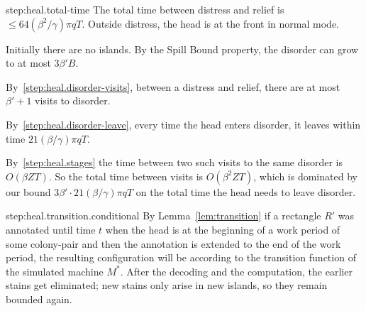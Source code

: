 \documentclass[11pt]{memoir}
\theoremstyle{definition} %
\renewcommand{\le}{\leq}
\newcommand{\fld}[1]{\ensuremath{\textit{#1\/}}}
\def\B{B}
\newcommand{\escno}{q}
\newcommand{\passno}{\pi}
\newcommand{\Q}{Q} %
\newcommand{\Tu}{T}
\newcommand{\Z}{Z} %
\newcommand{\Pass}{\fld{Pass}} %
\begin{document}
\begin{Proof}
\begin{step+}{step:heal.total-time}
  The total time between distress and relief is \( \le 64(\beta^{2}/\gamma)\passno\escno\Tu \).      
  Outside distress, the head is at the front in normal mode.
 \end{step+}
 \begin{pproof}
   Initially there are no islands.
By the Spill Bound property, the disorder %
can grow to at most \( 3\beta'\B \).

By~\ref{step:heal.disorder-visits}, between a distress and relief,
there are at most \( \beta'+1 \) visits to disorder.

By~\ref{step:heal.disorder-leave}, every time the head enters disorder,
it leaves within time \(  21(\beta/\gamma)\passno\escno\Tu \).

By~\ref{step:heal.stages} 
the time between two such visits to the same disorder is \( O(\beta\Z\Tu) \).
So the total time between visits is \( O(\beta^{2}\Z\Tu) \), which is
dominated by our bound
\(  3\beta'\cdot 21(\beta/\gamma)\passno\escno\Tu \) on the total time
the head needs to leave disorder.
\end{pproof}

\begin{step+}{step:heal.transition.conditional}
  By Lemma~\ref{lem:transition}
  if a rectangle \( R' \) was annotated until time \( t \) when the head is at the beginning
  of a work period of some colony-pair and then the annotation is extended to the
  end of the work period, the resulting configuration
  will be according to the transition function of the simulated machine \( M^{*} \).
  After the decoding and the computation, the earlier stains get eliminated;
  new stains only arise in new islands, so they remain bounded again.
\end{step+}



\end{Proof}
\end{document}
